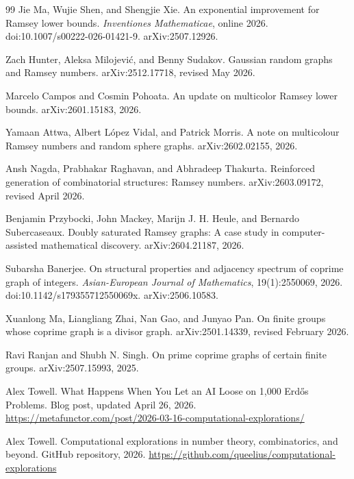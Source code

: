 \documentclass[11pt]{article}
\theoremstyle{plain}
\theoremstyle{definition}
\theoremstyle{remark}
\begin{document}
\begin{thebibliography}{99}
Jie Ma, Wujie Shen, and Shengjie Xie.
\newblock An exponential improvement for Ramsey lower bounds.
\newblock \emph{Inventiones Mathematicae}, online 2026.
\newblock doi:10.1007/s00222-026-01421-9.  arXiv:2507.12926.

Zach Hunter, Aleksa Milojevi\'c, and Benny Sudakov.
\newblock Gaussian random graphs and Ramsey numbers.
\newblock arXiv:2512.17718, revised May 2026.

Marcelo Campos and Cosmin Pohoata.
\newblock An update on multicolor Ramsey lower bounds.
\newblock arXiv:2601.15183, 2026.

Yamaan Attwa, Albert L\'opez Vidal, and Patrick Morris.
\newblock A note on multicolour Ramsey numbers and random sphere graphs.
\newblock arXiv:2602.02155, 2026.

Ansh Nagda, Prabhakar Raghavan, and Abhradeep Thakurta.
\newblock Reinforced generation of combinatorial structures: Ramsey numbers.
\newblock arXiv:2603.09172, revised April 2026.

Benjamin Przybocki, John Mackey, Marijn J. H. Heule, and Bernardo
Subercaseaux.
\newblock Doubly saturated Ramsey graphs: A case study in computer-assisted
mathematical discovery.
\newblock arXiv:2604.21187, 2026.

Subarsha Banerjee.
\newblock On structural properties and adjacency spectrum of coprime graph of
integers.
\newblock \emph{Asian-European Journal of Mathematics}, 19(1):2550069, 2026.
\newblock doi:10.1142/s179355712550069x.  arXiv:2506.10583.

Xuanlong Ma, Liangliang Zhai, Nan Gao, and Junyao Pan.
\newblock On finite groups whose coprime graph is a divisor graph.
\newblock arXiv:2501.14339, revised February 2026.

Ravi Ranjan and Shubh N. Singh.
\newblock On prime coprime graphs of certain finite groups.
\newblock arXiv:2507.15993, 2025.

Alex Towell.
\newblock What Happens When You Let an AI Loose on 1,000 Erd\H{o}s Problems.
\newblock Blog post, updated April 26, 2026.
\newblock \url{https://metafunctor.com/post/2026-03-16-computational-explorations/}

Alex Towell.
\newblock Computational explorations in number theory, combinatorics, and beyond.
\newblock GitHub repository, 2026.
\newblock \url{https://github.com/queelius/computational-explorations}


\end{thebibliography}
\end{document}
